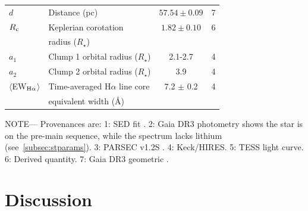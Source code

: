 \documentclass{nature3}
\begin{document}
\begin{table}
\begin{tabular}{llcc}
%
$d$\dotfill                             & Distance (pc)\dotfill                                          & $57.54 \pm 0.09$ & 7 \\
%
$R_{\rm c}$\dotfill		                  & Keplerian corotation\dotfill                                   & $1.82 \pm 0.10$  & 6 \\
                                        & \hspace{3pt} radius ($R_\star$)	                               &                      \\
%
$a_1$\dotfill                           & Clump 1 orbital radius ($R_\star$)\hspace{9pt}\dotfill         &  2.1-2.7         & 4 \\
$a_2$\dotfill                           & Clump 2 orbital radius ($R_\star$)\hspace{9pt}\dotfill         &  3.9             & 4 \\
%
$\langle$EW$_{\rm H\alpha}$$\rangle$    & Time-averaged H$\alpha$ line core                              &  7.2 $\pm$ 0.2   & 4 \\ 
                                        & \hspace{3pt} equivalent width (\AA)	                           &                      \\
\hline
\end{tabular}
\begin{flushleft}
\footnotesize{ \textsc{NOTE}---
Provenances are:
1: SED fit \cite{Bouma2024}.
2: Gaia DR3 photometry shows the star is on the pre-main sequence,
   while the spectrum lacks lithium (see~\ref{subsec:stparams}).
3: PARSEC v1.2S \cite{Chen2014}.
4: Keck/HIRES.
5: TESS light curve.
6: Derived quantity.
7: Gaia DR3 geometric \cite{GaiaDR3}.
}
\end{flushleft}
\vspace{-0.5cm}
\end{table}



\section{Discussion}
\end{document}
